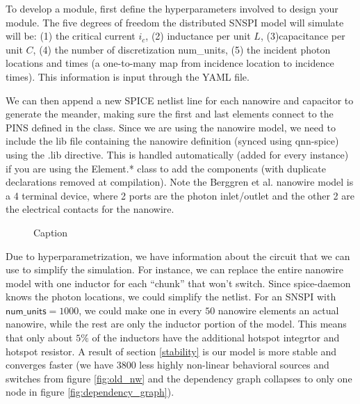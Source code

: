 \documentclass[]{article}
\newcommand{\todofig}[2][]{}
\newcommand{\cf}[1]{\textsf{#1}}
\begin{document}
To develop a module, first define the hyperparameters involved to design your module.
The five degrees of freedom the distributed SNSPI model will simulate will be: (1) the
critical current $i_c$, (2) inductance per unit $L$, (3)capacitance per unit $C$, 
(4) the number of discretization
\cf{num\_units}, (5) the incident photon locations and times (a one-to-many map from incidence 
location to incidence times). This information is input through the YAML file.

We can then append a new SPICE netlist line for each nanowire and capacitor to generate the
meander, making sure the first and last elements connect to the \cf{PINS} defined in the 
class. Since we are using the nanowire model, we need to include the lib file containing
the nanowire definition (synced using qnn-spice) using the \cf{.lib} directive. This is
handled automatically (added for every instance) if you are using the \cf{Element.*} 
class to add the components
(with duplicate declarations removed at compilation).
Note the
Berggren et al. nanowire model is a 4 terminal device, where 2 ports are the photon inlet/outlet
and the other 2 are the electrical contacts for the nanowire. 

\begin{figure}
    \centering
    \caption{Caption}
    \label{fig:snspi_run}
\end{figure}
\todofig[]{SNSPI Working}

Due to hyperparametrization, we have information about the circuit that we can use to
simplify the simulation. For instance, we can replace the entire nanowire model with
one inductor for each ``chunk'' that won't switch. Since spice-daemon knows the 
photon locations, we could simplify the netlist. For an SNSPI with $\cf{num\_units}=1000$,
we could make one in every $50$ nanowire elements an actual nanowire, while the
rest are only the inductor portion of the model. This means that only about $5\%$ of the inductors
have the additional hotspot integrtor and hotspot resistor. A result of section 
\ref{stability} is our model is more stable and converges faster (we have $3800$ less
highly non-linear behavioral sources and switches from figure \ref{fig:old_nw} and 
the dependency graph collapses
to only one node in figure \ref{fig:dependency_graph}).
\end{document}
